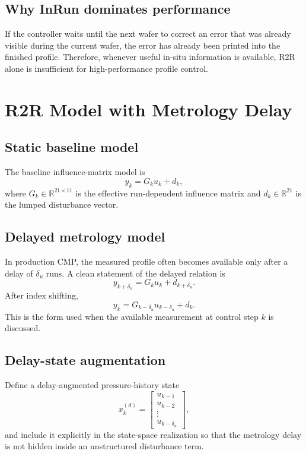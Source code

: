 \documentclass[11pt,a4paper]{article}
\newcommand{\R}{\mathbb{R}}
\begin{document}
\subsection{Why InRun dominates performance}
If the controller waits until the next wafer to correct an error that was already visible during the current wafer, the error has already been printed into the finished profile. Therefore, whenever useful in-situ information is available, R2R alone is insufficient for high-performance profile control.

\section{R2R Model with Metrology Delay}
\subsection{Static baseline model}
The baseline influence-matrix model is
\[
y_k=G_k u_k+d_k,
\]
where $G_k\in\R^{21\times 11}$ is the effective run-dependent influence matrix and $d_k\in\R^{21}$ is the lumped disturbance vector.

\subsection{Delayed metrology model}
In production CMP, the measured profile often becomes available only after a delay of $\delta_u$ runs. A clean statement of the delayed relation is
\[
y_{k+\delta_u}=G_k u_k+d_{k+\delta_u}.
\]
After index shifting,
\[
y_k=G_{k-\delta_u}u_{k-\delta_u}+d_k.
\]
This is the form used when the available measurement at control step $k$ is discussed.

\subsection{Delay-state augmentation}
Define a delay-augmented pressure-history state
\[
x_k^{(d)}=\begin{bmatrix}u_{k-1}\\u_{k-2}\\\vdots\\u_{k-\delta_u}\end{bmatrix},
\]
and include it explicitly in the state-space realization so that the metrology delay is not hidden inside an unstructured disturbance term.
\end{document}
